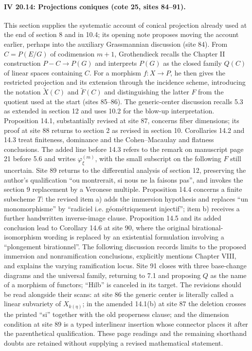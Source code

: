 \paragraph{IV 20.14: Projections coniques (cote 25, sites 84--91).}
This section supplies the systematic account of conical projection already used at the end of section 8 and in 10.4; its opening note proposes moving the account earlier, perhaps into the auxiliary Grassmannian discussion (site 84). From $C=P(E/G)$ of codimension $m+1$, Grothendieck recalls the Chapter II construction $P-C\to P(G)$ and interprets $P(G)$ as the closed family $Q(C)$ of linear spaces containing $C$. For a morphism $f:X\to P$, he then gives the restricted projection and its extension through the incidence scheme, introducing the notation $\widetilde X(C)$ and $\widetilde F(C)$ and distinguishing the latter $F$ from the quotient used at the start (sites 85--86). The generic-center discussion recalls 5.3 as extended in section 12 and uses 10.2 for the blow-up interpretation. Proposition 14.1, substantially revised at site 87, concerns fiber dimensions; its proof at site 88 returns to section 2 as revised in section 10. Corollaries 14.2 and 14.3 treat finiteness, dominance and the Cohen--Macaulay and flatness conclusions. The added line before 14.3 refers to the remark on manuscript page 21 before 5.6 and writes $\varphi^{(m)}_\xi$, with the small subscript on the following $F$ still uncertain. Site 89 returns to the differential analysis of section 12, preserving the author's qualification ``ou montrerait, si nous ne la faisons pas'', and invokes the section 9 replacement by a Veronese multiple. Proposition 14.4 concerns a finite subscheme $T$: the revised item a) adds the immersion hypothesis and replaces ``un monomorphisme'' by ``radiciel i.e. géométriquement injectif''; item b) receives a further handwritten inverse-image clause. Proposition 14.5 and its added conclusion lead to Corollary 14.6 at site 90, where the original birational-isomorphism wording is replaced by an existential formulation involving a ``plongement birationnel''. The following discussion records limits to the proposed immersion and nonramification conclusions, explicitly mentions Chapter VIII, and explains the varying ramification locus. Site 91 closes with three base-change diagrams and the universal family, returning to 7.1 and proposing $Q$ as the name of a morphism of functors; ``Hilb'' is canceled in its target. The revisions should be read alongside their scans: at site 86 the generic center is literally called a linear subvariety of $X_{k(\eta)}$; in the amended 14.1(b) at site 87 the deletion crosses the printed ``si'' together with the old properness clause; and the dimension condition at site 89 is a typed interlinear insertion whose connector places it after the parenthetical qualification. These page readings and the remaining shorthand doubts are retained without supplying a revised mathematical statement.
